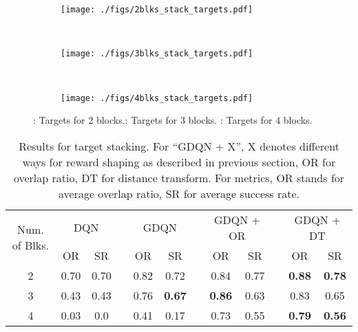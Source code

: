 \begin{figure}
    \centering
    \begin{subfigure}[b]{0.32\linewidth}
        \texttt{[image: ./figs/2blks\_stack\_targets.pdf]}
        \caption{}
        \label{fig:2blks_tgt_stack}
    \end{subfigure}
    ~ 
    \begin{subfigure}[b]{0.32\linewidth}
        \texttt{[image: ./figs/3blks\_stack\_targets.pdf]}
        \caption{}
        \label{fig:3blks_tgt_stack}
    \end{subfigure}
    ~ 
    \begin{subfigure}[b]{0.32\linewidth}
        \texttt{[image: ./figs/4blks\_stack\_targets.pdf]}
        \caption{}
        \label{fig:4blks_tgt_stack}
    \end{subfigure}
    \caption{\protect{}: Targets for $2$ blocks.\protect{}: Targets for $3$ blocks. \protect{}: Targets for $4$ blocks.}
    \label{fig:tgt_stack}
\end{figure}

\begin{table}
\centering
\begin{tabular}{@{}clccccccccccc@{}}
\toprule
\multicolumn{2}{c}{\multirow{2}{*}{Num. of Blks.}} & \multicolumn{2}{c}{DQN} &  & \multicolumn{2}{c}{GDQN} &  & \multicolumn{2}{c}{GDQN + OR} &  & \multicolumn{2}{c}{GDQN + DT} \\ \cmidrule(lr){3-4} \cmidrule(lr){6-7} \cmidrule(lr){9-10} \cmidrule(l){12-13} 
\multicolumn{2}{c}{}                               & OR         & SR         &  & OR          & SR         &  & OR            & SR            &  & OR            & SR            \\ \midrule
\multicolumn{2}{c}{2}                              & 0.70          & 0.70          &  & 0.82           & 0.72          &  & 0.84             & 0.77             &  & {\bf 0.88}             & {\bf 0.78}             \\
\multicolumn{2}{c}{3}                              & 0.43          & 0.43          &  & 0.76           & {\bf 0.67}          &  & {\bf 0.86}             & 0.63             &  & 0.83             & 0.65             \\
\multicolumn{2}{c}{4}                              & 0.03          & 0.0          &  & 0.41           & 0.17          &  & 0.73             & 0.55             &  & {\bf 0.79}             & {\bf 0.56}             \\ \bottomrule
\end{tabular}
\caption{Results for target stacking. For ``GDQN + X'', X denotes different ways for reward shaping as described in previous section, OR for overlap ratio, DT for distance transform. For metrics, OR stands for average overlap ratio, SR for average success rate.}
\label{tab:tgt_stack}
\end{table}